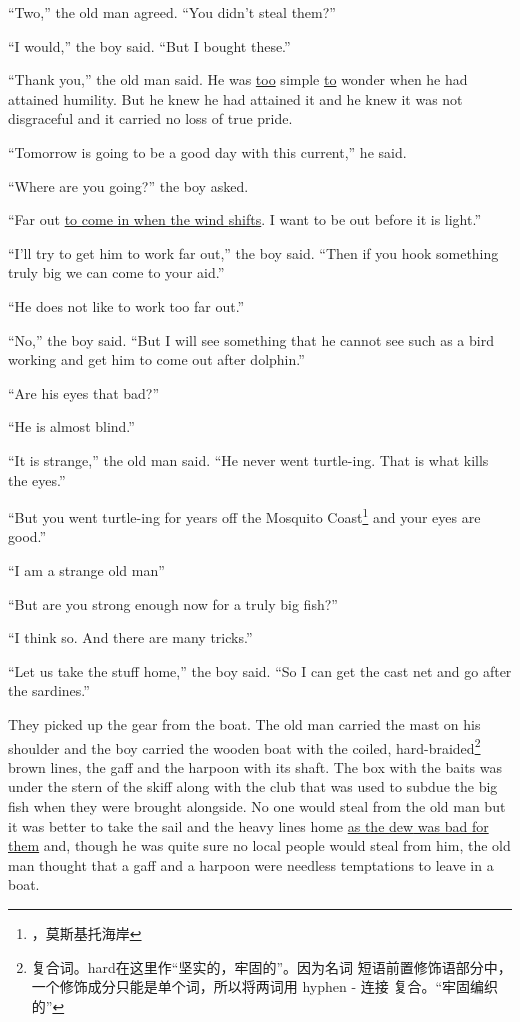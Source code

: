 ``Two,'' the old man agreed. ``You didn't \gls{steal} them?''

``I would,'' the boy said. ``But I bought these.''

``Thank you,'' the old man said. He was \uline{too} simple \uline{to}
\gls{wonder} when he had \gls{attained} \gls{humility}. But he knew he had
attained it and he knew it was not \gls{disgraceful} and it carried no loss
of true \gls{pride}.

``Tomorrow is going to be a good day with this current,'' he said.

``Where are you going?'' the boy asked.

``Far out \uline{to come in when the wind \glspl{shift}}. I want to be out before it is light.''

``I'll try to get him to work far out,'' the boy said. ``Then if you \gls{hook} something truly big we can come to your \gls{aid}.''

``He does not like to work too far out.''

``No,'' the boy said. ``But I will see something that he cannot see such as a bird working and get him to come out after \gls{dolphin}.''

``Are his eyes that bad?''

``He is almost blind.''

``It is strange,'' the old man said. ``He never went \gls{turtle}-ing. That is what kills the eyes.''

``But you went turtle-ing for years off the Mosquito
Coast\footnote{，莫斯基托海岸} and your eyes
are good.''

``I am a \gls{strange} old man''

``But are you strong enough now for a truly big fish?''

``I think so. And there are many \glspl{trick}.''

``Let us take the \gls{stuff} home,'' the boy said. ``So I can get the \gls{cast} net and go after the sardines.''

They picked up the \gls{gear} from the boat. The old man carried the mast on
his \gls{shoulder} and the boy carried the wooden boat with the coiled,
hard-\gls{braided}\footnote{复合词。hard在这里作“坚实的，牢固的”。因为名词
  短语前置修饰语部分中，一个修饰成分只能是单个词，所以将两词用 hyphen - 连接
  复合。“牢固编织的”} brown lines, the gaff and the harpoon with its
\gls{shaft}. The box with the baits was under the \gls{stern} of the
skiff along with the club that was used to \gls{subdue} the big fish
when they were brought \gls{alongside}. No one would \gls{steal} from the
old man but it was better to take the sail and the heavy lines home \uline{as
the \gls{dew} was bad for them} and, though he was quite sure no local people
would steal from him, the old man thought that a gaff and a harpoon were
\gls{needless} \glspl{temptation} to leave in a boat.

